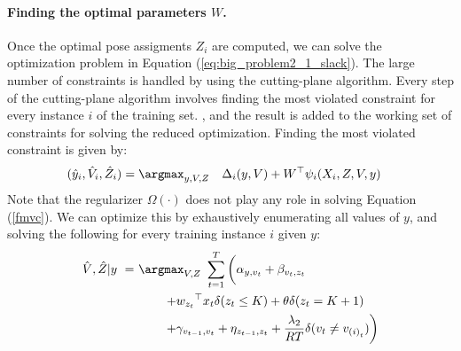 %
\paragraph{\textbf{Finding the optimal parameters $W$.}}
%
Once the optimal pose assigments $Z_i$ are computed, we can solve the optimization problem in Equation (\ref{eq:big_problem2_1_slack}).
The large number of constraints is handled by using the cutting-plane algorithm.
Every step of the cutting-plane algorithm involves finding the most violated constraint for every instance $i$ of the training set. , and the result is added to the working set of constraints for solving the reduced optimization.
%
Finding the most violated constraint is given by:
\begin{align}
\label{fmvc}
(\hat{y}_i,\hat{V}_i,\hat{Z}_i) &=\argmax_{y, V, Z} \quad \Delta_i( y, V) + W^\top \psi_i(X_i,Z,V,y)
\end{align}
Note that the regularizer $\Omega(\cdot)$ does not play any role in solving Equation (\ref{fmvc}). We can optimize this by exhaustively enumerating all values of $y$, and solving
the following for every training instance $i$ given $y$:
%
\begin{equation}
\label{eq:find_most_violated2}
\begin{split}
 \hat{V}, \hat{Z} | y ~ =~ &   \argmax_{V,Z} ~   \sum_{t=1}^T \left( \vphantom{ \frac{\lambda_2}{RT}} \alpha_{y,v_{t}} 
                  + \beta_{v_{t},z_{t}} \right. \\
			& \quad\quad \left. + {w_{z_{t}}}^\top x_{t} \delta(z_t \le K) + \theta \delta(z_t = K+1) \right. \\ 
				& \quad\quad \left. + \gamma_{v_{{t-1}},v_t} + \eta_{z_{{t-1}},z_t}  + \frac{\lambda_2}{RT}\delta(v_{t} \neq v_{{(i)}_t}) \right)%
\end{split}
\end{equation}
